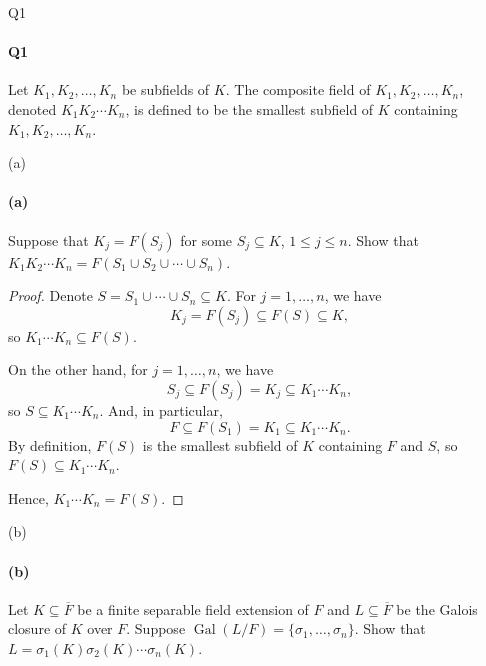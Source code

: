 \documentclass[12pt]{article}
\newenvironment{fullbox}{\begin{lrbox}{\savefullbox}\begin{minipage}{\dimexpr\textwidth-2\fboxsep\relax}}{\end{minipage}\end{lrbox}\begin{center}\framebox[\textwidth]{\usebox{\savefullbox}}\end{center}}
\newenvironment{pbox}[1][]{\begin{fullbox}\ifx#1\empty\else\paragraph{#1}\fi}{\end{fullbox}}
\newcommand{\<}{\langle}
\renewcommand{\>}{\rangle}
\DeclareMathOperator{\Gal}{Gal}
\begin{document}
\thispagestyle{title}

\begin{pbox}[Q1]
    Let $K_1, K_2, \dots, K_n$ be subfields of $K$. The composite field of $K_1, K_2, \dots, K_n$, denoted $K_1 K_2 \cdots K_n$, is defined to be the smallest subfield of $K$ containing $K_1, K_2,\dots, K_n$.
\end{pbox}

\begin{pbox}[(a)]
    Suppose that $K_j = F(S_j)$ for some $S_j \subseteq K$, $1 \leq j \leq n$. Show that $K_1 K_2 \cdots K_n = F(S_1 \cup S_2 \cup \cdots \cup S_n)$.
\end{pbox}

\begin{proof}
    Denote $S = S_1 \cup \cdots \cup S_n \subseteq K$. For $j = 1, \dots, n$, we have
    \[
        K_j = F(S_j) \subseteq F(S) \subseteq K,
    \]
    so $K_1 \cdots K_n \subseteq F(S)$.

    On the other hand, for $j = 1, \dots, n$, we have
    \[
        S_j \subseteq F(S_j) = K_j \subseteq K_1 \cdots K_n,
    \]
    so $S \subseteq K_1 \cdots K_n$.
    And, in particular,
    \[
        F \subseteq F(S_1) = K_1 \subseteq K_1 \cdots K_n.
    \]
    By definition, $F(S)$ is the smallest subfield of $K$ containing $F$ and $S$, so $F(S) \subseteq K_1 \cdots K_n$.

    Hence, $K_1 \cdots K_n = F(S)$.

\end{proof}

\begin{pbox}[(b)]
    Let $K \subseteq \overline{F}$ be a finite separable field extension of $F$ and $L \subseteq \overline{F}$ be the Galois closure of $K$ over $F$. Suppose $\Gal(L/F) = \{\sigma_1, \dots, \sigma_n\}$. Show that $L = \sigma_1(K) \sigma_2(K) \cdots \sigma_n(K)$.
\end{pbox}
\end{document}
